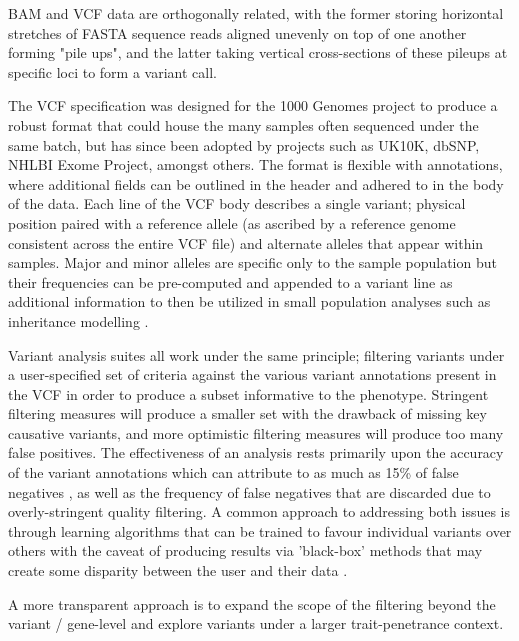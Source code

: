 \documentclass[twocolumn]{bmcart}%
\begin{document}
BAM and VCF data are orthogonally related, with the former storing horizontal stretches of FASTA sequence reads aligned unevenly on top of one another forming "pile ups", and the latter taking vertical cross-sections of these pileups at specific loci to form a variant call.

The VCF specification was designed for the 1000 Genomes project to produce a robust format that could house the many samples often sequenced under the same batch, but has since been adopted by projects such as UK10K, dbSNP, NHLBI Exome Project, amongst others. The format is flexible with annotations, where additional fields can be outlined in the header and adhered to in the body of the data. Each line of the VCF body describes a single variant; physical position paired with a reference allele (as ascribed by a reference genome consistent across the entire VCF file) and alternate alleles that appear within samples. Major and minor alleles are specific only to the sample population but their frequencies can be pre-computed and appended to a variant line as additional information to then be utilized in small population analyses such as inheritance modelling \cite{danecek2011variant}.

Variant analysis suites all work under the same principle; filtering variants under a user-specified set of criteria against the various variant annotations present in the VCF in order to produce a subset informative to the phenotype. Stringent filtering measures will produce a smaller set with the drawback of missing key causative variants, and more optimistic filtering measures will produce too many false positives. The effectiveness of an analysis rests primarily upon the accuracy of the variant annotations which can attribute to as much as 15\% of false negatives \cite{warden2014detailed}, as well as the frequency of false negatives that are discarded due to overly-stringent quality filtering. A common approach to addressing both issues is through learning algorithms that can be trained to favour individual variants over others with the caveat of producing results via 'black-box' methods that may create some disparity between the user and their data \cite{pabinger2014survey}.

A more transparent approach is to expand the scope of the filtering beyond the variant / gene-level and explore variants under a larger trait-penetrance context.%
\end{document}
